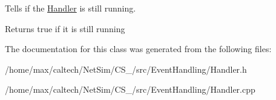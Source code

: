 \-Tells if the \hyperlink{classHandler}{\-Handler} is still running. 

\begin{DoxyReturn}{\-Returns}
true if it is still running 
\end{DoxyReturn}


\-The documentation for this class was generated from the following files\-:\begin{DoxyCompactItemize}
\item 
/home/max/caltech/\-Net\-Sim/\-C\-S\-\_/src/\-Event\-Handling/\-Handler.\-h\item 
/home/max/caltech/\-Net\-Sim/\-C\-S\-\_/src/\-Event\-Handling/\-Handler.\-cpp\end{DoxyCompactItemize}
